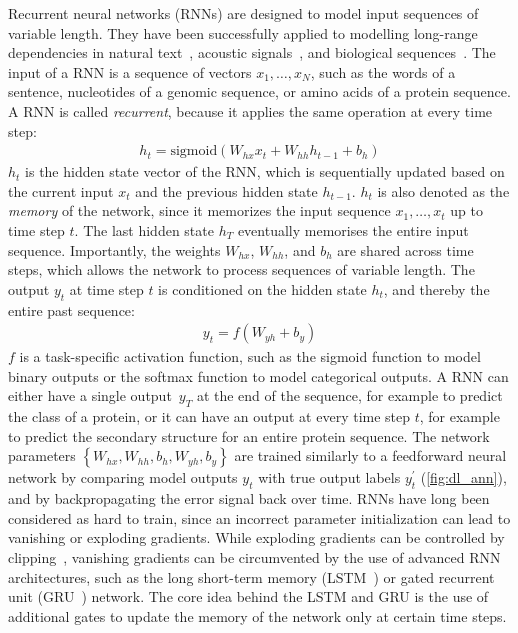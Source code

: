 Recurrent neural networks (RNNs) are designed to model input sequences of variable length. They have been successfully applied to modelling long-range dependencies in natural text~\citep{sutskever_sequence_2014,bahdanau_neural_2014,xiong_dynamic_2016}, acoustic signals~\citep{deng_deep_2015,graves_speech_2013,hinton_deep_2012}, and biological sequences~\citep{agathocleous_protein_2010,sonderby_protein_2014,li_protein_2016,quang_danq:_2016}.  The input of a RNN is a sequence of vectors $x_1,\ldots,x_N$, such as the words of a sentence, nucleotides of a genomic sequence, or amino acids of a protein sequence. A RNN is called \emph{recurrent}, because it applies the same operation at every time step:
\begin{align}
  h_t=\textrm{sigmoid}(W_{hx}x_t+W_{hh}h_{t-1}+b_h)
\end{align}
$h_t$ is the hidden state vector of the RNN, which is sequentially updated based on the current input $x_t$ and the previous hidden state $h_{t-1}$. $h_t$ is also denoted as the \emph{memory} of the network, since it memorizes the input sequence $x_1,\ldots,x_t$ up to time step $t$. The last hidden state $h_T$ eventually memorises the entire input sequence. Importantly, the weights $W_{hx}$, $W_{hh}$, and $b_h$ are shared across time steps, which allows the network to process sequences of variable length. The output $y_t$ at time step $t$ is conditioned on the hidden state $h_t$, and thereby the entire past sequence:
\begin{align}
  y_t=f(W_{yh}+b_y)
\end{align}
$f$ is a task-specific activation function, such as the sigmoid function to model binary outputs or the softmax function to model categorical outputs. A RNN can either have a single output~$y_T$ at the end of the sequence, for example to predict the class of a protein, or it can have an output at every time step $t$, for example to predict the secondary structure for an entire protein sequence. The network parameters $\left\{W_{hx},W_{hh},b_h,W_{yh},b_y\right\}$ are trained similarly to a feedforward neural network by comparing model outputs $y_t$ with true output labels $y^\prime_t$ (\autoref{fig:dl_ann}), and by backpropagating the error signal back over time. RNNs have long been considered as hard to train, since an incorrect parameter initialization can lead to vanishing or exploding gradients. While exploding gradients can be controlled by clipping~\citep{pascanu_difficulty_2013}, vanishing gradients can be circumvented by the use of advanced RNN architectures, such as the long short-term memory (LSTM~\citep{hochreiter_long_1997}) or gated recurrent unit (GRU~\citep{chung_empirical_2014}) network. The core idea behind the LSTM and GRU is the use of additional gates to update the memory of the network only at certain time steps.


